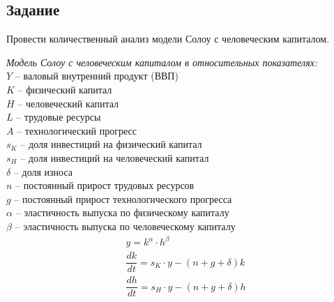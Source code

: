 \documentclass[14pt,fleqn]{extarticle}
\begin{document}
    \subsection*{Задание}
    Провести количественный анализ модели Солоу с человеческим капиталом.\\
    \newline

    \textit{Модель Солоу с человеческим капиталом в относительных показателях:}\\
    
    $Y$ -- валовый внутренний продукт (ВВП)\\
    $K$ -- физический капитал\\
    $H$ -- человеческий капитал\\
    $L$ -- трудовые ресурсы\\
    $A$ -- технологический прогресс\\
    $s_K$ -- доля инвестиций на физический капитал\\
    $s_H$ -- доля инвестиций на человеческий капитал\\
    $\delta$ -- доля износа\\
    $n$ -- постоянный прирост трудовых ресурсов\\
    $g$ -- постоянный прирост технологического прогресса\\
    $\alpha$ -- эластичность выпуска по физическому капиталу\\
    $\beta$ -- эластичность выпуска по человеческому капиталу\\
    
	\begin{align*}
		& y = k^\alpha \cdot h^\beta\\
		& \dfrac{dk}{dt} = s_K \cdot y - (n + g + \delta) k\\
		& \dfrac{dh}{dt} = s_H \cdot y - (n + g + \delta) h\\
	\end{align*}
\end{document}
